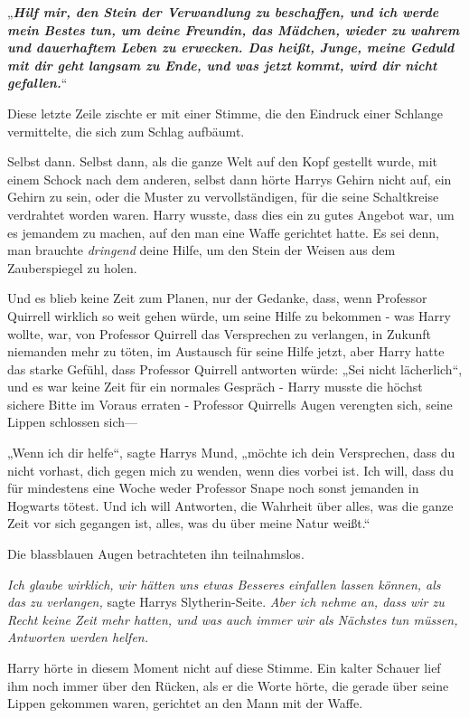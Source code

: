 {„\textbf{\emph{Hilf mir, den Stein der Verwandlung zu beschaffen, und ich werde mein Bestes tun, um deine Freundin, das Mädchen, wieder zu wahrem und dauerhaftem Leben zu erwecken. Das heißt, Junge, meine Geduld mit dir geht langsam zu Ende, und was jetzt kommt, wird dir nicht gefallen.}}“

Diese letzte Zeile zischte er mit einer Stimme, die den Eindruck einer Schlange vermittelte, die sich zum Schlag aufbäumt.

Selbst dann. Selbst dann, als die ganze Welt auf den Kopf gestellt wurde, mit einem Schock nach dem anderen, selbst dann hörte Harrys Gehirn nicht auf, ein Gehirn zu sein, oder die Muster zu vervollständigen, für die seine Schaltkreise verdrahtet worden waren. Harry wusste, dass dies ein zu gutes Angebot war, um es jemandem zu machen, auf den man eine Waffe gerichtet hatte. Es sei denn, man brauchte \emph{dringend} deine Hilfe, um den Stein der Weisen aus dem Zauberspiegel zu holen.

Und es blieb keine Zeit zum Planen, nur der Gedanke, dass, wenn Professor Quirrell wirklich so weit gehen würde, um seine Hilfe zu bekommen - was Harry wollte, war, von Professor Quirrell das Versprechen zu verlangen, in Zukunft niemanden mehr zu töten, im Austausch für seine Hilfe jetzt, aber Harry hatte das starke Gefühl, dass Professor Quirrell antworten würde: „Sei nicht lächerlich“, und es war keine Zeit für ein normales Gespräch - Harry musste die höchst sichere Bitte im Voraus erraten - Professor Quirrells Augen verengten sich, seine Lippen schlossen sich—

„Wenn ich dir helfe“, sagte Harrys Mund, „möchte ich dein Versprechen, dass du nicht vorhast, dich gegen mich zu wenden, wenn dies vorbei ist. Ich will, dass du für mindestens eine Woche weder Professor Snape noch sonst jemanden in Hogwarts tötest. Und ich will Antworten, die Wahrheit über alles, was die ganze Zeit vor sich gegangen ist, alles, was du über meine Natur weißt.“

Die blassblauen Augen betrachteten ihn teilnahmslos.

\emph{Ich glaube wirklich, wir hätten uns etwas Besseres einfallen lassen können, als das zu verlangen,} sagte Harrys Slytherin-Seite. \emph{Aber ich nehme an, dass wir zu Recht keine Zeit mehr hatten, und was auch immer wir als Nächstes tun müssen, Antworten werden helfen.}

Harry hörte in diesem Moment nicht auf diese Stimme. Ein kalter Schauer lief ihm noch immer über den Rücken, als er die Worte hörte, die gerade über seine Lippen gekommen waren, gerichtet an den Mann mit der Waffe.

}
